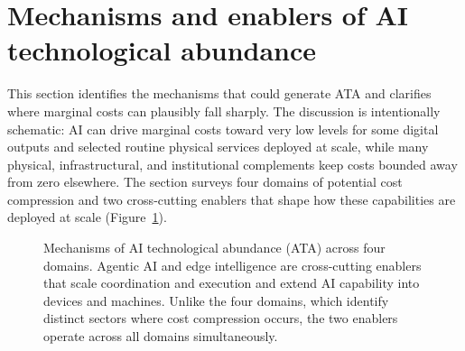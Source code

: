 \documentclass[11pt]{article}
\begin{document}
\section{Mechanisms and enablers of AI technological abundance}
\label{sec:abundance}

This section identifies the mechanisms that could generate ATA and clarifies where marginal costs can plausibly fall sharply. The discussion is intentionally schematic: AI can drive marginal costs toward very low levels for some digital outputs and selected routine physical services deployed at scale, while many physical, infrastructural, and institutional complements keep costs bounded away from zero elsewhere. The section surveys four domains of potential cost compression and two cross-cutting enablers that shape how these capabilities are deployed at scale (Figure~\ref{fig:abundance_domains_grid}).

\begin{figure}[t]
\centering
{}
\caption{Mechanisms of AI technological abundance (ATA) across four domains. Agentic AI and edge intelligence are
cross-cutting enablers that scale coordination and execution and extend AI capability into devices and machines.
Unlike the four domains, which identify distinct sectors where cost compression occurs, the two enablers operate
across all domains simultaneously.}
\label{fig:abundance_domains_grid}
\end{figure}
\end{document}
